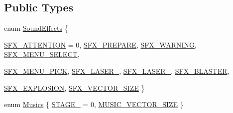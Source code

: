 \subsection*{Public Types}
\begin{DoxyCompactItemize}
\item 
enum \hyperlink{class_game_manager_a941d946acccde34eec72708b60aeca66}{SoundEffects} \{ \par
\hyperlink{class_game_manager_a941d946acccde34eec72708b60aeca66a2b520ff841f1b690ca7b28dde2660cb9}{SFX\_\-ATTENTION} =  0, 
\hyperlink{class_game_manager_a941d946acccde34eec72708b60aeca66a7cf46fb544500d9f398de9fb14f8996c}{SFX\_\-PREPARE}, 
\hyperlink{class_game_manager_a941d946acccde34eec72708b60aeca66a7e403c120fd618ad5674cfecbd28000e}{SFX\_\-WARNING}, 
\hyperlink{class_game_manager_a941d946acccde34eec72708b60aeca66a0cfd2d59e73b5c90ef41c144cab14034}{SFX\_\-MENU\_\-SELECT}, 
\par
\hyperlink{class_game_manager_a941d946acccde34eec72708b60aeca66aa5bb70a6e6695b6e7a7f488556c6b8ae}{SFX\_\-MENU\_\-PICK}, 
\hyperlink{class_game_manager_a941d946acccde34eec72708b60aeca66ac3c1bb60488e003764da31227e9fe99d}{SFX\_\-LASER\_}, 
\hyperlink{class_game_manager_a941d946acccde34eec72708b60aeca66af53ffa66d8d71e7dbac985d6664b0f97}{SFX\_\-LASER\_}, 
\hyperlink{class_game_manager_a941d946acccde34eec72708b60aeca66af8678ef3ba2ed09af691bad0b42e59d6}{SFX\_\-BLASTER}, 
\par
\hyperlink{class_game_manager_a941d946acccde34eec72708b60aeca66a0a0b7fd223a27de97010a2394cfd2661}{SFX\_\-EXPLOSION}, 
\hyperlink{class_game_manager_a941d946acccde34eec72708b60aeca66a64a48e4c7a4a5c990833b8fee81ef343}{SFX\_\-VECTOR\_\-SIZE}
 \}
\item 
enum \hyperlink{class_game_manager_a7fccedb9176b0430b47f50982a89a1d8}{Musics} \{ \hyperlink{class_game_manager_a7fccedb9176b0430b47f50982a89a1d8a69f8325e5dbc50689055a6bbf0cee788}{STAGE\_} =  0, 
\hyperlink{class_game_manager_a7fccedb9176b0430b47f50982a89a1d8a23cd0d54021a0734d4850c518d9cbba3}{MUSIC\_\-VECTOR\_\-SIZE}
 \}
\end{DoxyCompactItemize}
